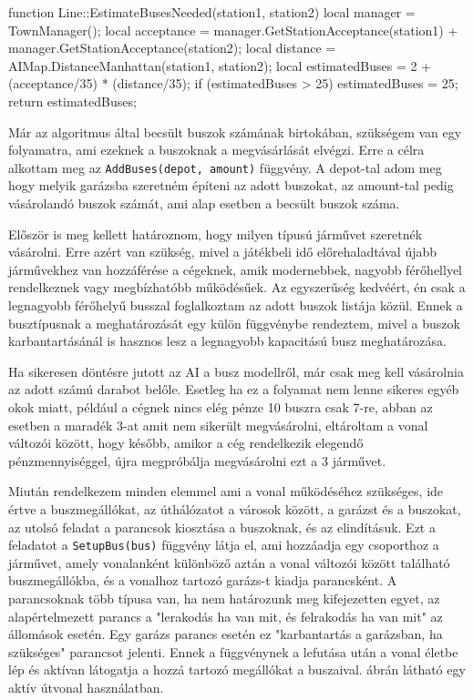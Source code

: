 \begin{cpp}
function Line::EstimateBusesNeeded(station1, station2)
{
  local manager = TownManager();
  local acceptance = manager.GetStationAcceptance(station1) +
   manager.GetStationAcceptance(station2);
  local distance = AIMap.DistanceManhattan(station1, station2);
  local estimatedBuses = 2 + (acceptance/35) * (distance/35);
  if (estimatedBuses > 25) {
    estimatedBuses = 25;
  }
  return estimatedBuses;
}
\end{cpp}

Már az algoritmus által becsült buszok számának birtokában, szükségem van egy folyamatra, ami ezeknek a buszoknak a megvásárlását elvégzi. Erre a célra alkottam meg az \texttt{AddBuses(depot, amount)} függvény. A depot-tal adom meg hogy melyik garázsba szeretném építeni az adott buszokat, az amount-tal pedig vásárolandó buszok számát, ami alap esetben a becsült buszok száma.

Először is meg kellett határoznom, hogy milyen típusú járművet szeretnék vásárolni. Erre azért van szükség, mivel a játékbeli idő előrehaladtával újabb járművekhez van hozzáférése a cégeknek, amik modernebbek, nagyobb férőhellyel rendelkeznek vagy megbízhatóbb működésűek. Az egyszerűség kedvéért, én csak a legnagyobb férőhelyű busszal foglalkoztam az adott buszok listája közül. Ennek a busztípusnak a meghatározását egy külön függvénybe rendeztem, mivel a buszok karbantartásánál is hasznos lesz a legnagyobb kapacitású busz meghatározása.

Ha sikeresen döntésre jutott az AI a busz modellről, már csak meg kell vásárolnia az adott számú darabot belőle. Esetleg ha ez a folyamat nem lenne sikeres egyéb okok miatt, például a cégnek nincs elég pénze 10 buszra csak 7-re, abban az esetben a maradék 3-at amit nem sikerült megvásárolni, eltároltam a vonal változói között, hogy később, amikor a cég rendelkezik elegendő pénzmennyiséggel, újra megpróbálja megvásárolni ezt a 3 járművet.

Miután rendelkezem minden elemmel ami a vonal működéséhez szükséges, ide értve a buszmegállókat, az úthálózatot a városok között, a garázst és a buszokat, az utolsó feladat a parancsok kiosztása a buszoknak, és az elindításuk. Ezt a feladatot a \texttt{SetupBus(bus)} függvény látja el, ami hozzáadja egy csoporthoz a járművet, amely vonalanként különböző aztán a vonal változói között található buszmegállókba, és a vonalhoz tartozó garázs-t kiadja parancsként. A parancsoknak több típusa van, ha nem határozunk meg kifejezetten egyet, az alapértelmezett parancs a "lerakodás ha van mit, és felrakodás ha van mit" az állomások esetén. Egy garázs parancs esetén ez "karbantartás a garázsban, ha szükséges" parancsot jelenti. Ennek a függvénynek a lefutása után a vonal életbe lép és aktívan látogatja a hozzá tartozó megállókat a buszaival.  ábrán látható egy aktív útvonal használatban.

